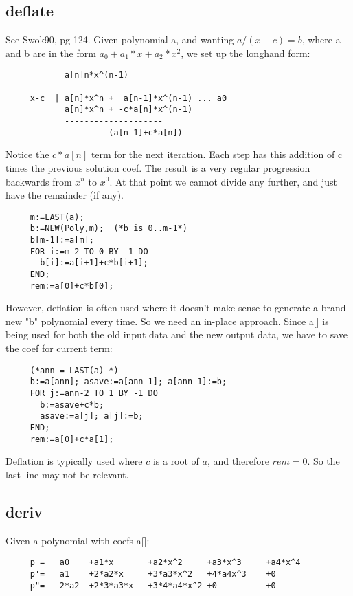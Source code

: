 \subsection*{deflate}
See Swok90, pg 124.  Given polynomial a, and wanting $a/(x-c)
= b$, where a and b are in the form $a_0+a_1*x+a_2*x^2$, we set up
the longhand form:
\begin{verbatim}     
            a[n]n*x^(n-1)
          ------------------------------
     x-c  | a[n]*x^n +  a[n-1]*x^(n-1) ... a0
            a[n]*x^n + -c*a[n]*x^(n-1)
            --------------------
                     (a[n-1]+c*a[n])
\end{verbatim}
     
Notice the $c*a[n]$ term for the next iteration.  Each step
has this addition of c times the previous solution coef.
The result is a very regular progression backwards from $x^n$
to $x^0$.  At that point we cannot divide any further, and just
have the remainder (if any).
\begin{tt} \begin{verbatim}
     m:=LAST(a);
     b:=NEW(Poly,m);  (*b is 0..m-1*)
     b[m-1]:=a[m];
     FOR i:=m-2 TO 0 BY -1 DO
       b[i]:=a[i+1]+c*b[i+1];
     END;
     rem:=a[0]+c*b[0];
\end{verbatim} \end{tt}
     
However, deflation is often used where it doesn't make sense
to generate a brand new "b" polynomial every time.  So we
need an in-place approach.  Since a[] is being used for both
the old input data and the new output data, we have to save
the coef for current term:
\begin{tt} \begin{verbatim}
     (*ann = LAST(a) *)
     b:=a[ann]; asave:=a[ann-1]; a[ann-1]:=b;
     FOR j:=ann-2 TO 1 BY -1 DO
       b:=asave+c*b;
       asave:=a[j]; a[j]:=b;
     END;
     rem:=a[0]+c*a[1];
\end{verbatim} \end{tt}

Deflation is typically used where $c$ is a root of $a$, and
therefore $rem=0$.  So the last line may not be relevant.

\subsection*{deriv}
Given a polynomial with coefs a[]:
\begin{verbatim}
     p =   a0    +a1*x       +a2*x^2     +a3*x^3     +a4*x^4
     p'=   a1    +2*a2*x     +3*a3*x^2   +4*a4x^3    +0
     p"=   2*a2  +2*3*a3*x   +3*4*a4*x^2 +0          +0
\end{verbatim}

